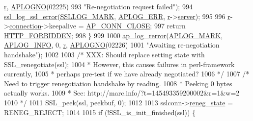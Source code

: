 \begin{DoxyCode}
{{{      \hyperlink{group__APACHE__CORE__CONFIG_ga091cdd45984e865a888a4f8bb8fe107a}{r}, \hyperlink{group__APACHE__CORE__LOG_ga1dee8a07e06bc5b3de8b89662c2cd666}{APLOGNO}(02225)
993                               \textcolor{stringliteral}{"Re-negotiation request failed"});
994                 \hyperlink{group__MOD__SSL__PRIVATE_ga9a4071d17f72df0574d3c8840886d3bb}{ssl\_log\_ssl\_error}(\hyperlink{group__MOD__SSL__PRIVATE_ga0e50481cba5952ce59ad2c103f8128a4}{SSLLOG\_MARK}, 
      \hyperlink{group__APACHE__CORE__LOG_ga57ad94ed8c92c4306de90479251a5d58}{APLOG\_ERR}, \hyperlink{group__APACHE__CORE__CONFIG_ga091cdd45984e865a888a4f8bb8fe107a}{r}->\hyperlink{structrequest__rec_a4a8059930ce9409cb885fdeef6921b7b}{server});
995 
996                 \hyperlink{group__APACHE__CORE__CONFIG_ga091cdd45984e865a888a4f8bb8fe107a}{r}->\hyperlink{structrequest__rec_a0924aae55826638314f76952ca5d60b1}{connection}->keepalive = \hyperlink{group__APACHE__CORE__DAEMON_gga0fc39bb8f47f9c1f418f28354416db79ac991e8ec951fe03c8c2f36495859034d}{AP\_CONN\_CLOSE};
997                 \textcolor{keywordflow}{return} \hyperlink{group__HTTP__Status_ga92646f876056a1e5013e0050496dc04d}{HTTP\_FORBIDDEN};
998             \}
999 
1000             \hyperlink{group__APACHE__CORE__LOG_ga4c112558ccffd6b363da102b2052d2a6}{ap\_log\_rerror}(\hyperlink{group__APACHE__CORE__LOG_ga655e126996849bcb82e4e5a14c616f4a}{APLOG\_MARK}, \hyperlink{group__APACHE__CORE__LOG_ga47fafbef7e478babdd92e90407f95b19}{APLOG\_INFO}, 0, 
      \hyperlink{group__APACHE__CORE__CONFIG_ga091cdd45984e865a888a4f8bb8fe107a}{r}, \hyperlink{group__APACHE__CORE__LOG_ga1dee8a07e06bc5b3de8b89662c2cd666}{APLOGNO}(02226)
1001                           \textcolor{stringliteral}{"Awaiting re-negotiation handshake"});
1002 
1003             \textcolor{comment}{/* XXX: Should replace setting state with SSL\_renegotiate(ssl);}
1004 \textcolor{comment}{             * However, this causes failures in perl-framework currently,}
1005 \textcolor{comment}{             * perhaps pre-test if we have already negotiated?}
1006 \textcolor{comment}{             */}
1007             \textcolor{comment}{/* Need to trigger renegotiation handshake by reading.}
1008 \textcolor{comment}{             * Peeking 0 bytes actually works.}
1009 \textcolor{comment}{             * See: http://marc.info/?t=145493359200002&r=1&w=2}
1010 \textcolor{comment}{             */}
1011             SSL\_peek(ssl, peekbuf, 0);
1012 
1013             sslconn->\hyperlink{structSSLConnRec_ad36678f508db0c5a628b6a99a76bf3c0}{reneg\_state} = RENEG\_REJECT;
1014 
1015             \textcolor{keywordflow}{if} (!SSL\_is\_init\_finished(ssl)) \{
}}}
\end{DoxyCode}
